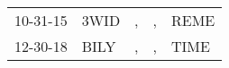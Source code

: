 \begin{supertabular}{lllll}
 10-31-15 &  3WID &  , &  , &  REME \\
 12-30-18 &  BILY &  , &  , &  TIME \\
\end{supertabular}
